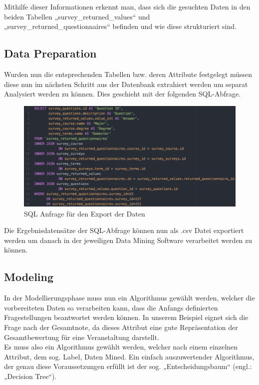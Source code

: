 Mithilfe dieser Informationen erkennt man, dass sich die gesuchten Daten in den
beiden Tabellen „survey\_returned\_values“ und „survey\_returned\_questionnaires“
befinden und wie diese strukturiert sind.

\subsection{Data Preparation}
\label{sec:example:data:dp}

Wurden nun die entsprechenden Tabellen bzw. deren Attribute festgelegt müssen
diese nun im nächsten Schritt aus der Datenbank extrahiert werden um separat
Analysiert werden zu können. Dies geschieht mit der folgenden SQL-Abfrage.

\begin{figure}[htb]
	\includegraphics[width=\textwidth]{gfx/sql.png}
	\caption{SQL Anfrage für den Export der Daten}
	\label{fig:example:data:dp:sql}
\end{figure}

Die Ergebnisdatensätze der SQL-Abfrage können nun als .csv Datei exportiert
werden um danach in der jeweiligen Data Mining Software verarbeitet werden zu
können.

\subsection{Modeling}
\label{sec:example:data:mod}

In der Modellierungsphase muss nun ein Algorithmus gewählt werden, welcher die
vorbereiteten Daten so verarbeiten kann, dass die Anfangs definierten
Fragestellungen beantwortet werden können. In unserem Beispiel eignet sich die
Frage nach der Gesamtnote, da dieses Attribut eine gute Repräsentation der
Gesamtbewertung für eine Veranstaltung darstellt. \\
Es muss also ein Algorithmus gewählt werden, welcher nach einem einzelnen
Attribut, dem sog. Label, Daten Mined. Ein einfach auszuwertender Algorithmus,
der genau diese Voraussetzungen erfüllt ist der sog. „Entscheidungsbaum“
(engl.: „Decision Tree“).

